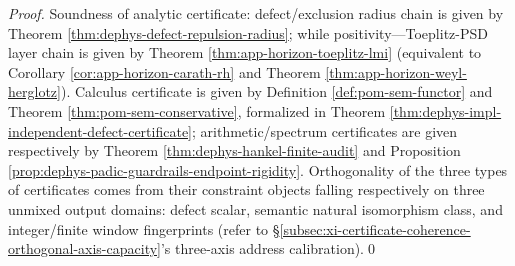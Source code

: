 \begin{proof}
Soundness of analytic certificate: defect/exclusion radius chain is given by Theorem \ref{thm:dephys-defect-repulsion-radius}; while positivity—Toeplitz-PSD layer chain is given by Theorem \ref{thm:app-horizon-toeplitz-lmi} (equivalent to Corollary \ref{cor:app-horizon-carath-rh} and Theorem \ref{thm:app-horizon-weyl-herglotz}).
Calculus certificate is given by Definition \ref{def:pom-sem-functor} and Theorem \ref{thm:pom-sem-conservative}, formalized in Theorem \ref{thm:dephys-impl-independent-defect-certificate};
arithmetic/spectrum certificates are given respectively by Theorem \ref{thm:dephys-hankel-finite-audit} and Proposition \ref{prop:dephys-padic-guardrails-endpoint-rigidity}.
Orthogonality of the three types of certificates comes from their constraint objects falling respectively on three unmixed output domains: defect scalar, semantic natural isomorphism class, and integer/finite window fingerprints (refer to \S\ref{subsec:xi-certificate-coherence-orthogonal-axis-capacity}'s three-axis address calibration).\qed
\end{proof}

